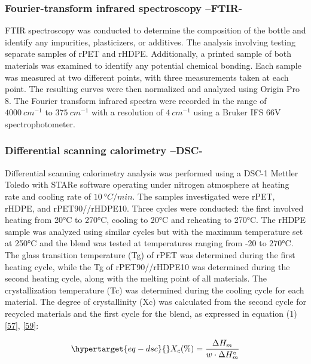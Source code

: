\documentclass[
]{article}
\begin{document}
\hypertarget{fourier-transform-infrared-spectroscopy-ftir-}{%
\subsubsection{Fourier-transform infrared spectroscopy
--FTIR-}\label{fourier-transform-infrared-spectroscopy-ftir-}}

FTIR spectroscopy was conducted to determine the composition of the
bottle and identify any impurities, plasticizers, or additives. The
analysis involving testing separate samples of rPET and rHDPE.
Additionally, a printed sample of both materials was examined to
identify any potential chemical bonding. Each sample was measured at two
different points, with three measurements taken at each point. The
resulting curves were then normalized and analyzed using Origin Pro 8.
The Fourier transform infrared spectra were recorded in the range of
\(4000~cm^{-1}\) to \(375~cm^{-1}\) with a resolution of \(4~cm^{-1}\)
using a Bruker IFS 66V spectrophotometer.

\hypertarget{differential-scanning-calorimetry-dsc-}{%
\subsubsection{Differential scanning calorimetry
--DSC-}\label{differential-scanning-calorimetry-dsc-}}

Differential scanning calorimetry analysis was performed using a DSC-1
Mettler Toledo with STARe software operating under nitrogen atmosphere
at heating rate and cooling rate of \(10~°C/min\). The samples
investigated were rPET, rHDPE, and rPET90//rHDPE10. Three cycles were
conducted: the first involved heating from 20°C to 270°C, cooling to
20°C and reheating to 270°C. The rHDPE sample was analyzed using similar
cycles but with the maximum temperature set at 250°C and the blend was
tested at temperatures ranging from -20 to 270°C. The glass transition
temperature (Tg) of rPET was determined during the first heating cycle,
while the Tg of rPET90//rHDPE10 was determined during the second heating
cycle, along with the melting point of all materials. The
crystallization temperature (Tc) was determined during the cooling cycle
for each material. The degree of crystallinity (Xc) was calculated from
the second cycle for recycled materials and the first cycle for the
blend, as expressed in equation (1)
\protect\hyperlink{ref-taghavi2018}{{[}57{]}},
\protect\hyperlink{ref-pan2020}{{[}59{]}}:

\begin{equation}\protect\hypertarget{eq-dsc}{}{
X_{c}(\%) = \frac{\Delta H_{m}}{w \cdot \Delta H_{m}^\circ}
}\label{eq-dsc}\end{equation}
\end{document}
